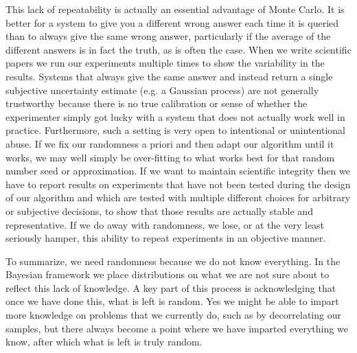 This lack of repeatability is actually an essential advantage of Monte Carlo.  It is better for a system to give you
a different wrong answer each time it is queried than to always give the same wrong answer, particularly if the average
of the different answers is in fact the truth, as is often the case.  When we write scientific papers we run our experiments
multiple times to show the variability in the results.  Systems that always give the same answer and instead return
a single subjective uncertainty estimate (e.g. a Gaussian process) are not generally trustworthy because there is no
true calibration or sense of whether the experimenter simply got lucky with a system that does not actually work well
in practice.  Furthermore, such a setting is very open to intentional or unintentional abuse.  If we fix our randomness
a priori and then adapt our algorithm until it works, we may well simply be over-fitting to what works best for that
random number seed or approximation. If we want to maintain scientific integrity then we have to report results on 
experiments that have not been
tested during the design of our algorithm and which are tested with multiple different choices for arbitrary or subjective
decisions, to show that those results are actually stable and representative.  If we do away with randomness, we lose, or at the very least
seriously hamper, this ability to repeat experiments in an objective manner.

To summarize, we need randomness because we do not know everything.  In the Bayesian framework we place distributions
on what we are not sure about to reflect this lack of knowledge.  A key part of this process is acknowledging that once we
have done this, what is left is random.   Yes we might be able to impart more knowledge on
problems that we currently do, such as by decorrelating our samples, but there always become a point where we have
imparted everything we know, after which what is left is truly random.

%
